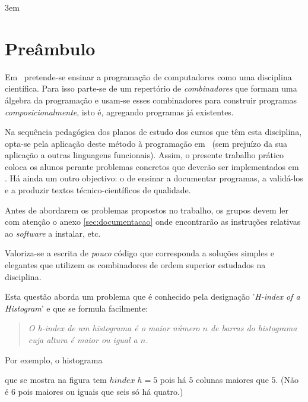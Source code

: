 \documentclass[11pt, a4paper, fleqn]{article}
\newcommand{\Varid}[1]{\mathit{#1}}
\def\resethooks{%
  \global\let\SaveRestoreHook\empty
  \global\let\ColumnHook\empty}
\let\hspre\empty
\let\hspost\empty
\begin{document}
\sffamily
\setlength{\parindent}{0em}
\emergencystretch 3em
\renewcommand{\baselinestretch}{1.25} 

\pagestyle{pagestyle}
\setlength{\parindent}{1em}

\section*{Preâmbulo}

Em \CP\ pretende-se ensinar a progra\-mação de computadores como uma disciplina
científica. Para isso parte-se de um repertório de \emph{combinadores} que
formam uma álgebra da programação %
e usam-se esses combinadores para construir programas \emph{composicionalmente},
isto é, agregando programas já existentes.

Na sequência pedagógica dos planos de estudo dos cursos que têm esta disciplina,
opta-se pela aplicação deste método à programação em \Haskell\ (sem prejuízo
da sua aplicação a outras linguagens funcionais). Assim, o presente trabalho
prático coloca os alunos perante problemas concretos que deverão ser implementados
em \Haskell. Há ainda um outro objectivo: o de ensinar a documentar programas,
a validá-los e a produzir textos técnico-científicos de qualidade.

Antes de abordarem os problemas propostos no trabalho, os grupos devem ler
com atenção o anexo \ref{sec:documentacao} onde encontrarão as instruções
relativas ao \emph{software} a instalar, etc.

Valoriza-se a escrita de \emph{pouco} código que corresponda a soluções simples
e elegantes que utilizem os combinadores de ordem superior estudados na disciplina.


\Problema

Esta questão aborda um problema que é conhecido pela designação '\emph{H-index of a Histogram}'
e que se formula facilmente:
\begin{quote}\em
O h-index de um histograma é o maior número \ensuremath{\Varid{n}} de barras do histograma cuja altura é maior ou igual a \ensuremath{\Varid{n}}.
\end{quote}
Por exemplo, o histograma 
\resethooks
que se mostra na figura
	\histograma
tem \ensuremath{\Varid{hindex}\;\Varid{h}\mathrel{=}\mathrm{5}}
pois há \ensuremath{\mathrm{5}} colunas maiores que \ensuremath{\mathrm{5}}. (Não é \ensuremath{\mathrm{6}} pois maiores ou iguais que seis só há quatro.)
\end{document}
